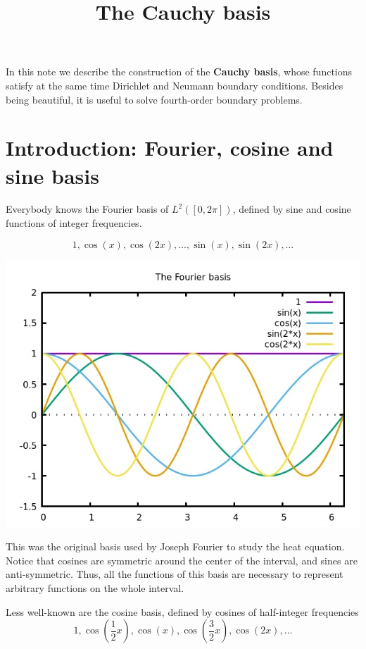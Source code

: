 \title{The Cauchy basis}

In this note we describe the construction of the {\bf Cauchy basis}, whose
functions satisfy at the same time Dirichlet and Neumann boundary conditions.
Besides being beautiful, it is useful to solve fourth-order boundary
problems.


\section{Introduction: Fourier, cosine and sine basis}

Everybody knows the Fourier basis of $L^2([0,2\pi])$, defined by sine and
cosine functions of integer frequencies.

$$
	1,\cos(x),\cos(2x),\ldots,\sin(x),\sin(2x),\ldots
$$

\includegraphics{sincos.png}


This was the original basis used by Joseph Fourier to study the heat equation.
Notice that cosines are symmetric around the center of the interval, and
sines are anti-symmetric.  Thus, all the functions of this basis are
necessary to represent arbitrary functions on the whole interval.

Less well-known are the cosine basis, defined by cosines of half-integer
frequencies
$$
1,\cos\left(\frac{1}{2}x\right),
\cos(x),
\cos\left(\frac{3}{2}x\right),
\cos(2x),\ldots
$$

